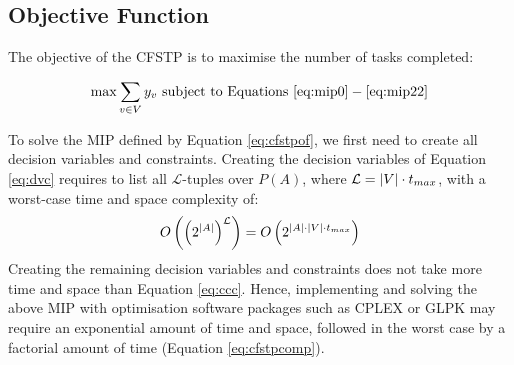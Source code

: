 \subsection{Objective Function}\label{sec:of0}

The objective of the CFSTP is to maximise the number of tasks completed:

\begin{equation}\label{eq:cfstpof}
    \max \sum_{v \in V} y_v \text{ subject to Equations } \ref{eq:mip0} - \ref{eq:mip22}
\end{equation}

To solve the MIP defined by Equation \ref{eq:cfstpof}, we first need to create all
decision variables and constraints. Creating the decision variables of Equation
\ref{eq:dvc} requires to list all $\mathcal{L}$-tuples over $P(A)$, where $\mathcal{L} =
|V| \cdot t_{max}$, with a worst-case time and space complexity of:
\begin{equation}\label{eq:ccc}
    O\left( {\left(2^{|A|}\right)}^{\mathcal{L}} \right) =
    O\left( 2^{|A| \cdot |V| \cdot t_{max}} \right)
\end{equation}
Creating the remaining decision variables and constraints does not take more time and
space than Equation \ref{eq:ccc}.
Hence, implementing and solving the above MIP with optimisation software packages such as
CPLEX or GLPK may require an exponential amount of time and space, followed in the worst
case by a factorial amount of time (Equation \ref{eq:cfstpcomp}).
